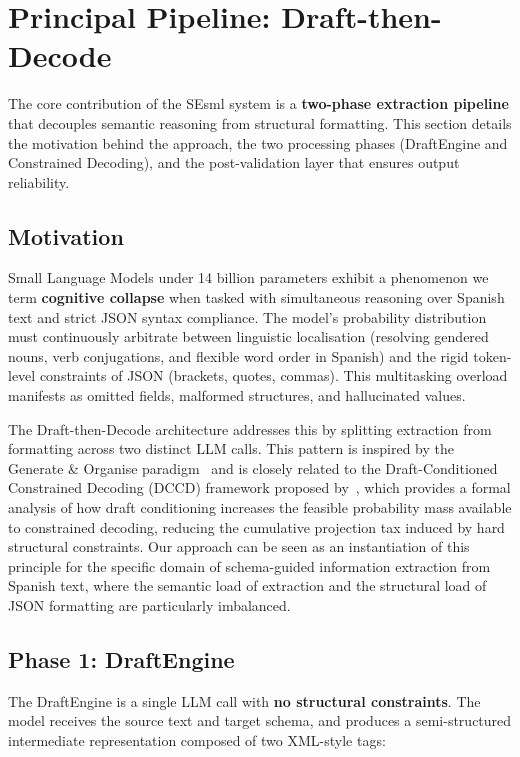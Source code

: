 \documentclass[onecolumn]{ceurart}
\begin{document}
\section{Principal Pipeline: Draft-then-Decode}
\label{sec:draft-decode}

The core contribution of the SEsml system is a \textbf{two-phase extraction
pipeline} that decouples semantic reasoning from structural formatting. This
section details the motivation behind the approach, the two processing phases
(DraftEngine and Constrained Decoding), and the post-validation layer that
ensures output reliability.

\subsection{Motivation}

Small Language Models under 14 billion parameters exhibit a phenomenon we term
\textbf{cognitive collapse} when tasked with simultaneous reasoning over Spanish
text and strict JSON syntax compliance. The model's probability distribution
must continuously arbitrate between linguistic localisation (resolving gendered
nouns, verb conjugations, and flexible word order in Spanish) and the rigid
token-level constraints of JSON (brackets, quotes, commas). This multitasking
overload manifests as omitted fields, malformed structures, and hallucinated
values.

The Draft-then-Decode architecture addresses this by splitting extraction from
formatting across two distinct LLM calls. This pattern is inspired by the
Generate \& Organise paradigm~\citep{li2024generate} and is closely related to
the Draft-Conditioned Constrained Decoding (DCCD) framework proposed
by~\citet{reddy2026dccd}, which provides a formal analysis of how draft
conditioning increases the feasible probability mass available to constrained
decoding, reducing the cumulative projection tax induced by hard structural
constraints. Our approach can be seen as an instantiation of this principle for
the specific domain of schema-guided information extraction from Spanish text,
where the semantic load of extraction and the structural load of JSON formatting
are particularly imbalanced.

\subsection{Phase 1: DraftEngine}

The DraftEngine is a single LLM call with \textbf{no structural constraints}.
The model receives the source text and target schema, and produces a
semi-structured intermediate representation composed of two XML-style tags:
\end{document}
